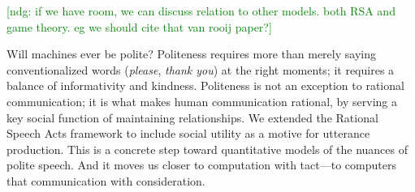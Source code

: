 \documentclass[10pt,letterpaper]{article}
\newcommand{\ndg}[1]{\textcolor{Green}{[ndg: #1]}}
\begin{document}

\ndg{if we have room, we can discuss relation to other models. both RSA and game theory. eg we should cite that van rooij paper?}

Will machines ever be polite? 
Politeness requires more than merely saying conventionalized words (\emph{please}, \emph{thank you}) at the right moments; it requires a balance of informativity and kindness. 
Politeness is not an exception to rational communication; it is what makes human communication rational, by serving a key social function of maintaining relationships.
We extended the Rational Speech Acts framework to include social utility as a motive for utterance production.
This is a concrete step toward quantitative models of the nuances of polite speech.
And it moves us closer to computation with tact---to computers that communication with consideration.





\setlength{\bibleftmargin}{.125in}
\setlength{\bibindent}{-\bibleftmargin}


\end{document}
